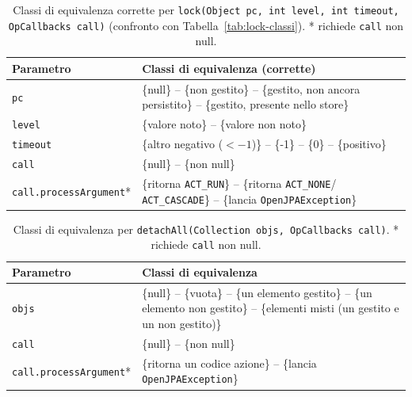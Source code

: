 \begin{table}[H]
\centering
\begin{tabularx}{\textwidth}{>{\raggedright\arraybackslash}p{} >{\raggedright\arraybackslash}X}
\toprule
Parametro & Classi di equivalenza (corrette) \\
\midrule
\texttt{pc} & \{null\} -- \{non gestito\} -- \{gestito, non ancora persistito\} -- \{gestito,
presente nello store\} \\
\texttt{level} & \{valore noto\} -- \{valore non noto\} \\
\texttt{timeout} & \{altro negativo ($<-1$)\} -- \{-1\} -- \{0\} -- \{positivo\} \\
\midrule
\texttt{call} & \{null\} -- \{non null\} \\
\texttt{call.processArgument}* & \{ritorna \texttt{ACT\_RUN}\} -- \{ritorna \texttt{ACT\_NONE}/
\texttt{ACT\_CASCADE}\} -- \{lancia \texttt{OpenJPAException}\} \\
\bottomrule
\end{tabularx}
\caption{Classi di equivalenza corrette per \texttt{lock(Object pc, int level, int timeout,
OpCallbacks call)} (confronto con Tabella~\ref{tab:lock-classi}). * richiede \texttt{call} non null.}
\label{tab:lock-classi-corrette}
\end{table}

\begin{table}[H]
\centering
\begin{tabularx}{\textwidth}{>{\raggedright\arraybackslash}p{} >{\raggedright\arraybackslash}X}
\toprule
Parametro & Classi di equivalenza \\
\midrule
\texttt{objs} & \{null\} -- \{vuota\} -- \{un elemento gestito\} -- \{un elemento non gestito\}
-- \{elementi misti (un gestito e un non gestito)\} \\
\midrule
\texttt{call} & \{null\} -- \{non null\} \\
\texttt{call.processArgument}* & \{ritorna un codice azione\} -- \{lancia \texttt{OpenJPAException}\} \\
\bottomrule
\end{tabularx}
\caption{Classi di equivalenza per \texttt{detachAll(Collection objs, OpCallbacks call)}.
* richiede \texttt{call} non null.}
\label{tab:detachall-classi}
\end{table}

